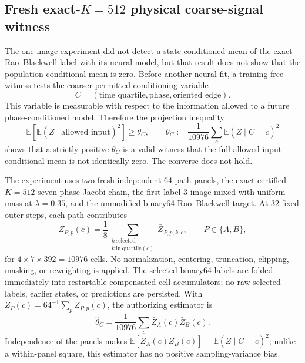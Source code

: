 \documentclass[11pt]{article}
\numberwithin{equation}{section}
\newcommand{\E}{\mathbb E}
\newcommand{\1}{\mathbf 1}
\begin{document}
\subsection{Fresh exact-\texorpdfstring{\(K=512\)}{K=512} physical coarse-signal witness}

The one-image experiment did not detect a state-conditioned mean of the
exact Rao--Blackwell label with its neural model, but that result does not
show that the population conditional mean is zero.  Before another neural
fit, a training-free witness tests the coarser permitted conditioning
variable
\begin{equation}
 C=(\text{time quartile},\text{phase},\text{oriented edge}).
\end{equation}
This variable is measurable with respect to the information allowed to a
future phase-conditioned model.  Therefore the projection inequality
\begin{equation}
 \E\!\left[\E(\bar Z\mid\text{allowed input})^2\right]
 \geq
 \theta_C,\qquad
 \theta_C:=\frac1{10976}\sum_c \E(\bar Z\mid C=c)^2
 \label{eq:d0-coarse-signal-lower-bound}
\end{equation}
shows that a strictly positive \(\theta_C\) is a valid witness that the
full allowed-input conditional mean is not identically zero.  The converse
does not hold.

The experiment uses two fresh independent 64-path panels, the exact
certified \(K=512\) seven-phase Jacobi chain, the first label-3 image mixed
with uniform mass at \(\lambda=0.35\), and the unmodified binary64
Rao--Blackwell target.  At 32 fixed outer steps, each path contributes
\begin{equation}
 Z_{P,p}(c)=\frac18\sum_{\substack{k\ \mathrm{selected}\\
                         k\ \mathrm{in\ quartile}(c)}}
              \bar Z_{P,p,k,c},
 \qquad P\in\{A,B\},
\end{equation}
for \(4\times7\times392=10976\) cells.  No normalization, centering,
truncation, clipping, masking, or reweighting is applied.  The selected
binary64 labels are folded immediately into restartable
compensated cell accumulators; no raw selected labels, earlier states, or
predictions are persisted.  With
\(\bar Z_P(c)=64^{-1}\sum_p Z_{P,p}(c)\), the authorizing estimator is
\begin{equation}
 \widehat\theta_C
 =\frac1{10976}\sum_c \bar Z_A(c)\bar Z_B(c).
 \label{eq:d0-coarse-cross-panel-estimator}
\end{equation}
Independence of the panels makes
\(\E[\bar Z_A(c)\bar Z_B(c)]=\E(\bar Z\mid C=c)^2\); unlike a within-panel
square, this estimator has no positive sampling-variance bias.
\end{document}
